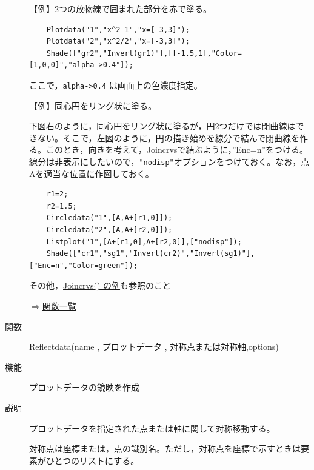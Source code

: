 \documentclass[papersize,a4paper,12pt,uplatex]{jsarticle}
\begin{document}
\begin{description}
\vspace{\baselineskip}
【例】2つの放物線で囲まれた部分を赤で塗る。
\begin{verbatim}
    Plotdata("1","x^2-1","x=[-3,3]");
    Plotdata("2","x^2/2","x=[-3,3]");
    Shade(["gr2","Invert(gr1)"],[[-1.5,1],"Color=[1,0,0]","alpha->0.4"]);
\end{verbatim}

ここで，\verb|alpha->0.4| は画面上の色濃度指定。

\vspace{\baselineskip}
\begin{center}   \end{center}
  
【例】同心円をリング状に塗る。

  下図右のように，同心円をリング状に塗るが，円2つだけでは閉曲線はできない。そこで，左図のように，円の描き始めを線分で結んで閉曲線を作る。このとき，向きを考えて，Joincrvsで結ぶように，''Enc=n''をつける。線分は非表示にしたいので，\verb|"nodisp"|オプションをつけておく。なお，点Aを適当な位置に作図しておく。

\begin{verbatim}
    r1=2;
    r2=1.5;
    Circledata("1",[A,A+[r1,0]]);
    Circledata("2",[A,A+[r2,0]]);
    Listplot("1",[A+[r1,0],A+[r2,0]],["nodisp"]);
    Shade(["cr1","sg1","Invert(cr2)","Invert(sg1)"],["Enc=n","Color=green"]);
\end{verbatim}
\begin{center}   \end{center}

その他，\hyperlink{joincrvs}{Joincrvs() の例}も参照のこと

\begin{flushright}  \hyperlink{functionlist}{$\Rightarrow$関数一覧}\end{flushright}

\vspace{\baselineskip}
\hypertarget{reflectdata}{}
\item[関数]  Reflectdata(name , プロットデータ , 対称点または対称軸,options)
\item[機能]  プロットデータの鏡映を作成
\item[説明]  プロットデータを指定された点または軸に関して対称移動する。

  対称点は座標または，点の識別名。ただし，対称点を座標で示すときは要素がひとつのリストにする。
  

\end{description}
\end{document}

